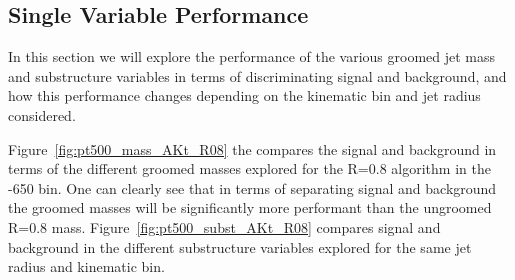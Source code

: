 \subsection{Single Variable Performance}

In this section we will explore the performance of the various groomed
jet mass and substructure variables in terms of discriminating signal
and background, and how this performance changes depending on the
kinematic bin and jet radius considered.

Figure~\ref{fig:pt500_mass_AKt_R08} the compares the signal and
background in terms of the different groomed masses explored for the
\antikt R=0.8 algorithm in the -650 bin. One can clearly see
that in terms of separating signal and background the groomed masses
will be significantly more performant than the ungroomed \antikt R=0.8
mass.
Figure~\ref{fig:pt500_subst_AKt_R08}
compares signal and background in the different substructure variables
explored for the same jet radius and kinematic bin. 

